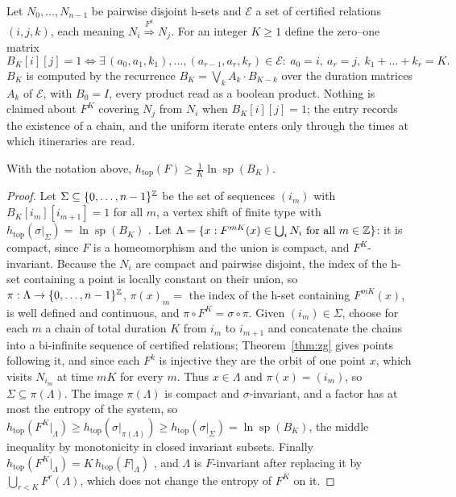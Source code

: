 \documentclass[11pt]{article}
\newcommand{\htop}{h_{\mathrm{top}}}
\newcommand{\sprad}{\operatorname{sp}}
\newcommand{\cover}[1]{\stackrel{#1}{\Longrightarrow}}
\begin{document}
Let $N_0,\dots,N_{n-1}$ be pairwise disjoint h-sets and $\mathcal E$ a set of certified relations $(i,j,k)$, each
meaning $N_i\cover{F^k}N_j$. For an integer $K\ge1$ define the zero--one matrix
\[
B_K[i][j]=1\iff\exists\,(a_0,a_1,k_1),\dots,(a_{r-1},a_r,k_r)\in\mathcal E:\ a_0=i,\ a_r=j,\ k_1+\dots+k_r=K .
\]
$B_K$ is computed by the recurrence $B_K=\bigvee_{k}A_k\cdot B_{K-k}$ over the duration matrices $A_k$ of
$\mathcal E$, with $B_0=I$, every product read as a boolean product. Nothing is claimed about $F^K$ covering
$N_j$ from $N_i$ when $B_K[i][j]=1$; the entry records the existence of a chain, and the uniform iterate enters only
through the times at which itineraries are read.

\begin{lemma}\label{lem:ent}
With the notation above, $\htop(F)\ge\frac1K\ln\sprad(B_K)$.
\end{lemma}

\begin{proof}
Let $\Sigma\subseteq\{0,\dots,n-1\}^{\mathbb{Z}}$ be the set of sequences $(i_m)$ with $B_K[i_m][i_{m+1}]=1$ for all $m$, a
vertex shift of finite type with $\htop(\sigma|_\Sigma)=\ln\sprad(B_K)$ \cite[Chapter 4]{LM95}. Let
$\Lambda=\{x:F^{mK}(x)\in\bigcup_iN_i\text{ for all }m\in\mathbb{Z}\}$: it is compact, since $F$ is a homeomorphism and the
union is compact, and $F^K$-invariant. Because the $N_i$ are compact and pairwise disjoint, the index of the h-set
containing a point is locally constant on their union, so $\pi:\Lambda\to\{0,\dots,n-1\}^{\mathbb{Z}}$,
$\pi(x)_m=$ the index of the h-set containing $F^{mK}(x)$, is well defined and continuous, and $\pi\circ F^K=\sigma\circ\pi$.
Given $(i_m)\in\Sigma$, choose for each $m$ a chain of total duration $K$ from $i_m$ to $i_{m+1}$ and concatenate the
chains into a bi-infinite sequence of certified relations; Theorem~\ref{thm:zg} gives points following it, and since
each $F^k$ is injective they are the orbit of one point $x$, which visits $N_{i_m}$ at time $mK$ for every $m$. Thus
$x\in\Lambda$ and $\pi(x)=(i_m)$, so $\Sigma\subseteq\pi(\Lambda)$. The image $\pi(\Lambda)$ is compact and
$\sigma$-invariant, and a factor has at most the entropy of the system, so
$\htop(F^K|_\Lambda)\ge\htop(\sigma|_{\pi(\Lambda)})\ge\htop(\sigma|_\Sigma)=\ln\sprad(B_K)$, the middle
inequality by monotonicity in closed invariant subsets. Finally $\htop(F^K|_\Lambda)=K\,\htop(F|_\Lambda)$
\cite[Chapter 7]{Wal82}, and $\Lambda$ is $F$-invariant after replacing it by $\bigcup_{r<K}F^r(\Lambda)$, which
does not change the entropy of $F^K$ on it.
\end{proof}
\end{document}
